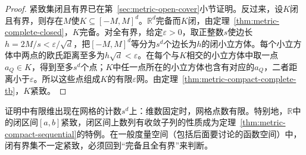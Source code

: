 \begin{proof}
紧致集闭且有界已在第~\ref{sec:metric-open-cover}小节证明。反过来，设$K$闭且有界，则存在$M$使$K\subseteq[-M,M]^d$。$\mathbb R^d$完备而$K$闭，由定理~\ref{thm:metric-complete-closed}，$K$完备。对全有界，给定$\varepsilon>0$，取正整数$s$使边长$h=2M/s<\varepsilon/\sqrt d$，把$[-M,M]^d$等分为$s^d$个边长为$h$的闭小立方体。每个小立方体中两点的欧氏距离至多为$h\sqrt d<\varepsilon$。在每个与$K$相交的小立方体中取一点$a_Q\in K$，得到至多$s^d$个点；$K$中任一点所在的小立方体也含有对应的$a_Q$，二者距离小于$\varepsilon$。所以这些点组成$K$的有限$\varepsilon$网。由定理~\ref{thm:metric-compact-complete-tb}，$K$紧致。
\end{proof}

证明中有限维出现在网格的计数$s^d$上：维数固定时，网格点数有限。特别地，$\mathbb R$中的闭区间$[a,b]$紧致，闭区间上数列有收敛子列的性质成为定理~\ref{thm:metric-compact-sequential}的特例。在一般度量空间（包括后面要讨论的函数空间）中，闭有界集不一定紧致，必须回到“完备且全有界”来判断。
